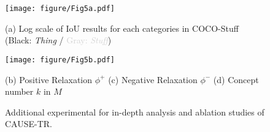 \documentclass{article} \usepackage{iclr2024_conference,times}
\begin{document}
\begin{figure*}[t!]
\vspace{-13mm}
\centering
\texttt{[image: figure/Fig5a.pdf]}
\vspace*{-7mm}
\begin{flushleft}
    {\hspace{0.23cm} (a) Log scale of IoU results for each categories in COCO-Stuff (Black: \textit{Thing} / \textcolor{lightgray}{Gray: \textit{Stuff}})}
\end{flushleft}
\vspace*{-1mm}
\texttt{[image: figure/Fig5b.pdf]}
\vspace*{-6mm}
\begin{flushleft}
    {\hspace{0.35cm} (b) Positive Relaxation $\phi^{+}$ \hspace{0.85cm}(c) Negative Relaxation $\phi^{-}$ \hspace{0.55cm} (d) Concept number $k$ in $M$}
\end{flushleft}	
\vspace*{-0.45cm}
\caption{Additional experimental 
for in-depth analysis and ablation studies of CAUSE-TR.} 
\label{fig:ablation}
\end{figure*}
\end{document}
